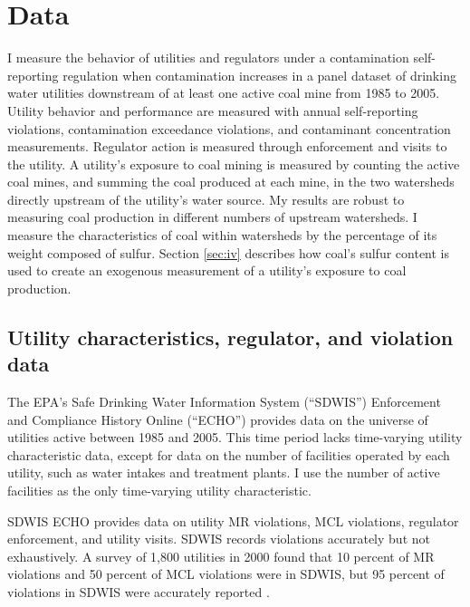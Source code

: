 \documentclass[12pt]{article}
\begin{document}
\section{Data}\label{sec:data}

I measure the behavior of utilities and regulators under a contamination self-reporting regulation when contamination increases in a panel dataset of drinking water utilities downstream of at least one active coal mine from 1985 to 2005. Utility behavior and performance are measured with annual self-reporting violations, contamination exceedance violations, and contaminant concentration measurements. Regulator action is measured through enforcement and visits to the utility. A utility's exposure to coal mining is measured by counting the active coal mines, and summing the coal produced at each mine, in the two watersheds directly upstream of the utility's water source. My results are robust to measuring coal production in different numbers of upstream watersheds. I measure the characteristics of coal within watersheds by the percentage of its weight composed of sulfur. Section \ref{sec:iv} describes how coal's sulfur content is used to create an exogenous measurement of a utility's exposure to coal production.

\subsection{Utility characteristics, regulator, and violation data}

The EPA's Safe Drinking Water Information System (``SDWIS'') Enforcement and Compliance History Online (``ECHO'') provides data on the universe of utilities active between 1985 and 2005. This time period lacks time-varying utility characteristic data, except for data on the number of facilities operated by each utility, such as water intakes and treatment plants. I use the number of active facilities as the only time-varying utility characteristic.

SDWIS ECHO provides data on utility MR violations, MCL violations, regulator enforcement, and utility visits. SDWIS records violations accurately but not exhaustively. A survey of 1,800 utilities in 2000 found that 10 percent of MR violations and 50 percent of MCL violations were in SDWIS, but 95 percent of violations in SDWIS were accurately reported \parencite{epaviolationreliability}.
\end{document}
